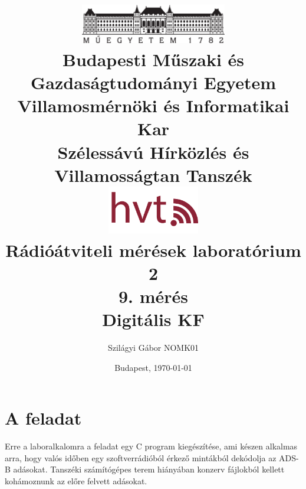 \frenchspacing
\pagestyle{plain} 


\title{
    \centering
    \includegraphics[width=0.48\textwidth]{kep/bme_logo.pdf} \\
    \vspace{0.5cm}
    \large{\bf Budapesti Műszaki és Gazdaságtudományi Egyetem \\
    Villamosmérnöki és Informatikai Kar \\
    Szélessávú Hírközlés és Villamosságtan Tanszék}\\
    \vspace{0.5cm}
    \includegraphics[width=0.3\textwidth]{kep/hvt_logo.png} \\
    \vspace{3cm}
    \large{Rádióátviteli mérések laboratórium 2} \\
    \vspace{2cm}
    \Large{\bf{9. mérés\\Digitális KF}} \\
    \vspace{2cm}
}



\author{Szilágyi Gábor \hspace{1cm} NOMK01}
\date{Budapest, \today}



%
\maketitle
\setcounter{page}{2}
\section{A feladat}
    Erre a laboralkalomra a feladat egy C program kiegészítése, ami készen alkalmas arra, hogy valós időben egy szoftverrádióból érkező mintákból dekódolja az ADS-B adásokat. Tanszéki számítógépes terem hiányában konzerv fájlokból kellett kohámoznunk az előre felvett adásokat.
